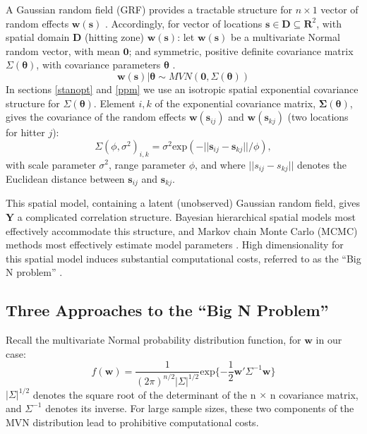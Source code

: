 A Gaussian random field (GRF) provides a tractable structure for $n \times 1$ vector of random effects $\pmb{w}(\pmb{s})$ \citep{Gelfand2010}. Accordingly, for vector of locations $\pmb{s} \in \pmb{D} \subseteq \pmb{R}^{2}$, with spatial domain $\pmb{D}$ (hitting zone) $\pmb{w}(\pmb{s})$: let $\pmb{w}(\pmb{s})$ be a multivariate Normal random vector, with mean $\pmb{0}$; and symmetric, positive definite covariance matrix $\Sigma(\pmb{\theta})$, with covariance parameters $\pmb{\theta}$ \citep{Haran2011}.
\begin{equation} \label{eq:w}
\pmb{w}(\pmb{s}) | \pmb{\theta} \sim MVN(\pmb{0}, \Sigma(\pmb{\theta})) 
\end{equation}
In sections \ref{stanopt} and \ref{ppm} we use an isotropic spatial exponential covariance structure for $\Sigma(\pmb{\theta})$. Element $i,k$ of the exponential covariance matrix, $\pmb{\Sigma}(\pmb{\theta})$, gives the covariance of the random effects $\pmb{w}(\pmb{s}_{ij})$ and $\pmb{w}(\pmb{s}_{kj})$ (two locations for hitter $j$):
\begin{equation} \label{eq:exp}
\Sigma(\phi, \sigma^{2})_{i,k} = \sigma^{2} \text{exp}(-||\pmb{s}_{ij} - \pmb{s}_{kj}||/\phi),
\end{equation}
with scale parameter $\sigma^{2}$, range parameter $\phi$, and where $||s_{ij} - s_{kj}||$ denotes the Euclidean distance between $\pmb{s}_{ij}$ and $\pmb{s}_{kj}$.

This spatial model, containing a latent (unobserved) Gaussian random field, gives $\pmb{Y}$ a complicated correlation structure. Bayesian hierarchical spatial models most effectively accommodate this structure, and Markov chain Monte Carlo (MCMC) methods most effectively estimate model parameters \citep{Banerjee2014}. High dimensionality for this spatial model induces substantial computational costs, referred to as the ``Big N problem'' \citep{Lindgren2011}.

\subsection{Three Approaches to the ``Big N Problem''}

Recall the multivariate Normal probability distribution function, for $\pmb{w}$ in our case:
\begin{equation} \label{eq:mvn}
f(\pmb{w}) = \frac{1}{(2\pi)^{n/2}|\Sigma|^{1/2}} \text{exp}\{ -\frac{1}{2}\pmb{w}'\Sigma^{-1}\pmb{w} \}
\end{equation}
$|\Sigma|^{1/2}$ denotes the square root of the determinant of the n $\times$ n covariance matrix, and $\Sigma^{-1}$ denotes its inverse. For large sample sizes, these two components of the MVN distribution lead to prohibitive computational costs.

